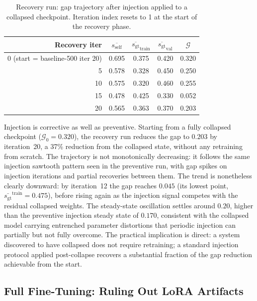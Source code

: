 \documentclass{article}
\newcommand{\gap}{\mathcal{G}}          %
\newcommand{\self}{s_{\text{self}}}     %
\newcommand{\gt}{s_{\text{gt}}}         %
\begin{document}
\begin{table}[h]
\centering
\caption{Recovery run: gap trajectory after injection applied to a collapsed checkpoint.
Iteration index resets to 1 at the start of the recovery phase.}
\label{tab:recovery}
\small
\begin{tabular}{rcccc}
\toprule
Recovery iter & $\overline{\self}$ & $\overline{\gt}_\text{train}$ & $\overline{\gt}_\text{val}$ & $\gap$ \\
\midrule
0 (start = baseline-500 iter 20) & 0.695 & 0.375 & 0.420 & 0.320 \\
5  & 0.578 & 0.328 & 0.450 & 0.250 \\
10 & 0.575 & 0.320 & 0.460 & 0.255 \\
15 & 0.478 & 0.425 & 0.330 & 0.052 \\
20 & 0.565 & 0.363 & 0.370 & 0.203 \\
\bottomrule
\end{tabular}
\end{table}

Injection is corrective as well as preventive.
Starting from a fully collapsed checkpoint ($\gap_0 = 0.320$), the recovery run
reduces the gap to $0.203$ by iteration~20, a 37\% reduction from the collapsed
state, without any retraining from scratch.
The trajectory is not monotonically decreasing: it follows the same injection sawtooth
pattern seen in the preventive run, with gap spikes on injection iterations and partial
recoveries between them.
The trend is nonetheless clearly downward: by iteration~12 the gap reaches $0.045$
(its lowest point, $\bar{\gt}^\text{train} = 0.475$), before rising again as the
injection signal competes with the residual collapsed weights.
The steady-state oscillation settles around $0.20$, higher than the preventive
injection steady state of $0.170$, consistent with the collapsed model carrying
entrenched parameter distortions that periodic injection can partially but not fully
overcome.
The practical implication is direct: a system discovered to have collapsed does not
require retraining; a standard injection protocol applied post-collapse recovers
a substantial fraction of the gap reduction achievable from the start.

\subsection{Full Fine-Tuning: Ruling Out LoRA Artifacts}
\label{sec:full-ft}
\end{document}
